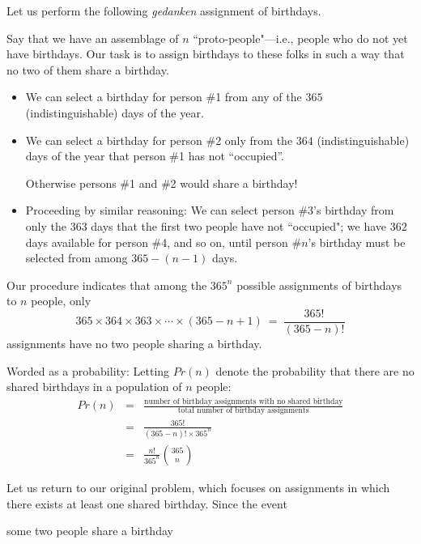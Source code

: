 \bigskip

Let us perform the following {\em gedanken} assignment of birthdays.

\smallskip

Say that we have an assemblage of $n$ ``proto-people"---i.e., people who do not yet have  birthdays.  Our task is to assign birthdays to these folks in such a way that no two of them share a birthday.
\begin{itemize}
\item
We can select a birthday for person \#1 from any of the $365$ (indistinguishable) days of the year.
\medskip\item
We can select a birthday for person \#2 only from the $364$ (indistinguishable) days of the year that person \#1 has not ``occupied''.

\smallskip

Otherwise persons \#1 and \#2 would share a birthday!
\medskip\item
Proceeding by similar reasoning:  We can select person \#3's birthday from only the $363$ days that the first two people have not ``occupied"; we have $362$ days available for person \#4, and so on, until person \#$n$'s birthday must be selected from among $365-(n-1)$ days.
\end{itemize}
Our procedure indicates that among the $365^n$ possible assignments of birthdays to $n$ people, only
\[ 365 \times 364 \times 363 \times \cdots \times (365-n+1) \ = \ \frac{365!}{(365-n)!}  \]
assignments have no two people sharing a birthday.

\smallskip

Worded as a probability: Letting $Pr(n)$ denote the probability that there are no shared birthdays in a population of $n$ people:
\begin{eqnarray*}
Pr(n) & = &
\frac{\mbox{number of birthday assignments with no shared birthday}}
{\mbox{total number of birthday assignments}} \\
 &  = & \frac{365!}{ (365-n)!  \times 365^n} \\
 & = & \frac{n!}{365^n} {365 \choose n}
\end{eqnarray*}

\medskip

Let us return to our original problem, which focuses on assignments in which there exists at least one shared birthday.  Since the event

\smallskip

\hspace*{.25in}some two people share a birthday


